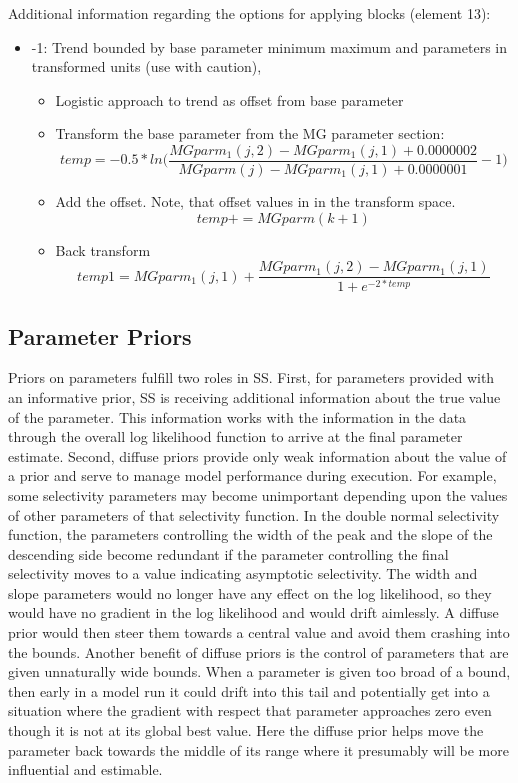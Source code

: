Additional information regarding the options for applying blocks (element 13):
\begin{itemize} 
	\item -1: Trend bounded by base parameter minimum maximum and parameters in transformed units (use with caution),
		\begin{itemize}
			\item Logistic approach to trend as offset from base parameter
			\item Transform the base parameter from the MG parameter section:
			\begin{equation}
				temp = -0.5*ln\Bigg(\frac{MGparm_1(j,2)-MGparm_1(j,1)+0.0000002}{MGparm(j)-MGparm_1(j,1)+0.0000001}-1\Bigg)
			\end{equation}
			\item Add the offset. Note, that offset values in in the transform space.
			\begin{equation}
				temp += MGparm(k+1)
			\end{equation}
			\item Back transform
			\begin{equation}
				temp1 = MGparm_1(j,1)+\frac{MGparm_1(j,2)-MGparm_1(j,1)}{1+e^{-2*temp}}
			\end{equation}			
		\end{itemize}
\end{itemize}

\hypertarget{PriorDescrip}{}
\subsection{Parameter Priors}
Priors on parameters fulfill two roles in SS.  First, for parameters provided with an informative prior, SS is receiving additional information about the true value of the parameter.  This information works with the information in the data through the overall log likelihood function to arrive at the final parameter estimate.  Second, diffuse priors provide only weak information about the value of a prior and serve to manage model performance during execution.  For example, some selectivity parameters may become unimportant depending upon the values of other parameters of that selectivity function.  In the double normal selectivity function, the parameters controlling the width of the peak and the slope of the descending side become redundant if the parameter controlling the final selectivity moves to a value indicating asymptotic selectivity.  The width and slope parameters would no longer have any effect on the log likelihood, so they would have no gradient in the log likelihood and would drift aimlessly.  A diffuse prior would then steer them towards a central value and avoid them crashing into the bounds.  Another benefit of diffuse priors is the control of parameters that are given unnaturally wide bounds.  When a parameter is given too broad of a bound, then early in a model run it could drift into this tail and potentially get into a situation where the gradient with respect that parameter approaches zero even though it is not at its global best value.  Here the diffuse prior helps move the parameter back towards the middle of its range where it presumably will be more influential and estimable.  

